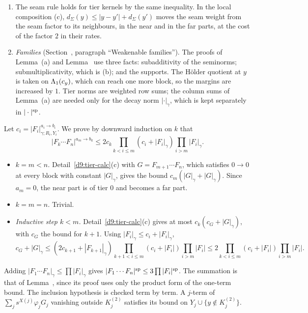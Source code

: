 \begin{detail}
\begin{enumerate}[label=(\alph*)]
\begin{itemize}
\begin{itemize}
\item the term $C\eps|\tilde h|_{\Lam_1}$ is absorbed for $C\eps\le\frac12$.
\end{itemize}
\end{itemize}
In all cases $\mathfrak n^t_{y'}(\varphi g)\le CM^{-1}(1+|y-y'|)\mathfrak n^t_{y'}(g)$ and $\mathfrak n^t_y(\varphi Fg)\le CM^{-1}\mathfrak n^t_y(Fg)$. Then $(1+t)e^{-\gamma t/2}\le C\gamma^{-1}$ gives the rate $\gamma/2$.
\item The seam rule  holds for tier kernels by the same inequality. In the local composition (c), $d_\Sigma(y)\le|y-y'|+d_\Sigma(y')$ moves the seam weight from the seam factor to its neighbours, in the near and in the far parts, at the cost of the factor $2$ in their rates.
\item \emph{Families} (Section~, paragraph ``Weakenable families''). The proofs of Lemma~(a) and Lemma~ use three facts: subadditivity of the seminorms; submultiplicativity, which is (b); and the supports. The H\"older quotient at $y$ is taken on $\Lambda_1(c_y)$, which can reach one more block, so the margins are increased by $1$. Tier norms are weighted row sums; the column sums of Lemma~(a) are needed only for the decay norm $|\cdot|_\gamma$, which is kept separately in $|\cdot|^{\rm sp}$.
\end{enumerate}
\end{detail}

\begin{detail}\label{d9:split}
Let $c_i=|F_i|^{a_i\to b_i}_{\gamma;R_i,Y_i}$. We prove by downward induction on $k$ that
\[
|F_k\cdots F_n|^{a_m\to b_k}\le2c_k\prod_{k<i\le m}(c_i+|F_i|_\gamma)\prod_{i>m}|F_i|_\gamma .
\]
\begin{itemize}
\item \emph{$k=m<n$.} Detail~\ref{d9:tier-calc}(c) with $G=F_{m+1}\cdots F_n$, which satisfies $0\to0$ at every block with constant $|G|_\gamma$, gives the bound $c_m(|G|_\gamma+|G|_\gamma)$. Since $a_m=0$, the near part is of tier $0$ and becomes a far part.
\item \emph{$k=m=n$.} Trivial.
\item \emph{Inductive step $k<m$.} Detail~\ref{d9:tier-calc}(c) gives at most $c_k(c_G+|G|_\gamma)$, with $c_G$ the bound for $k+1$. Using $|F_i|_\gamma\le c_i+|F_i|_\gamma$,
\[
c_G+|G|_\gamma\le(2c_{k+1}+|F_{k+1}|_\gamma)\prod_{k+1<i\le m}(c_i+|F_i|)\prod_{i>m}|F_i|\le2\prod_{k<i\le m}(c_i+|F_i|)\prod_{i>m}|F_i| .
\]
\end{itemize}
Adding $|F_1\cdots F_n|_\gamma\le\prod|F_i|_\gamma$ gives $|F_1\cdots F_n|^{\rm sp}\le3\prod|F_i|^{\rm sp}$. The summation is that of Lemma~, since its proof uses only the product form of the one-term bound. The inclusion hypothesis is checked term by term. A $j$-term of $\sum_js^{X(j)}\varphi_jG_j$ vanishing outside $K_j^{(2)}$ satisfies its bound on $Y_j\cup\{y\notin K_j^{(2)}\}$.
\end{detail}

